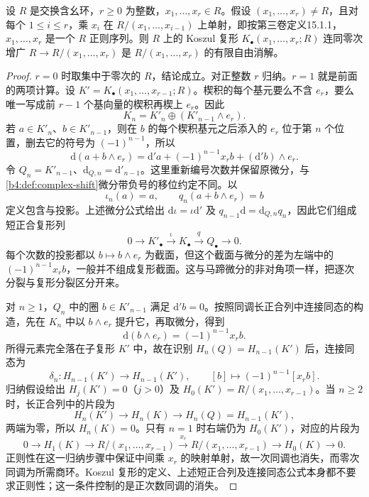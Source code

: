 \begin{proposition}\label{b4:prop:koszul-resolution}
	设 \(R\) 是交换含幺环，\(r\ge0\) 为整数，\(x_1,\ldots,x_r\in R\)。假设 \((x_1,\ldots,x_r)\ne R\)，且对每个 \(1\le i\le r\)，乘 \(x_i\) 在 \(R/(x_1,\ldots,x_{i-1})\) 上单射，即按第三卷定义15.1.1，\(x_1,\ldots,x_r\) 是一个 \(R\) 正则序列。则 \(R\) 上的 Koszul 复形 \(K_\bullet(x_1,\ldots,x_r;R)\) 连同零次增广 \(R\to R/(x_1,\ldots,x_r)\) 是 \(R/(x_1,\ldots,x_r)\) 的有限自由消解。
\end{proposition}
\begin{proof}
	\(r=0\) 时取集中于零次的 \(R\)，结论成立。对正整数 \(r\) 归纳。\(r=1\) 就是前面的两项计算。设 \(K'=K_\bullet(x_1,\ldots,x_{r-1};R)\)。楔积的每个基元要么不含 \(e_r\)，要么唯一写成前 \(r-1\) 个基向量的楔积再楔上 \(e_r\)。因此
	\[
		K_n=K'_n\oplus(K'_{n-1}\wedge e_r).
	\]
	若 \(a\in K'_n\)、\(b\in K'_{n-1}\)，则在 \(b\) 的每个楔积基元之后添入的 \(e_r\) 位于第 \(n\) 个位置，删去它的符号为 \((-1)^{n-1}\)，所以
	\[
		\mathrm{d}(a+b\wedge e_r)=\mathrm{d}'a+(-1)^{n-1}x_rb+(\mathrm{d}'b)\wedge e_r.
	\]
	令 \(Q_n=K'_{n-1}\)、\(\mathrm{d}_{Q,n}=\mathrm{d}'_{n-1}\)。这里重新编号次数并保留原微分，与\cref{b4:def:complex-shift}微分带负号的移位约定不同。以
	\[
		\iota_n(a)=a,\qquad q_n(a+b\wedge e_r)=b
	\]
	定义包含与投影。上述微分公式给出 \(\mathrm{d}\iota=\iota\mathrm{d}'\) 及 \(q_{n-1}\mathrm{d}=\mathrm{d}_{Q,n}q_n\)，因此它们组成短正合复形列
	\[
		0\longrightarrow K'_\bullet\xrightarrow{\iota}K_\bullet \xrightarrow{q}Q_\bullet\longrightarrow0.
	\]
	每个次数的投影都以 \(b\mapsto b\wedge e_r\) 为截面，但这个截面与微分的差为左端中的 \((-1)^{n-1}x_rb\)，一般并不组成复形截面。这与马蹄微分的非对角项一样，把逐次分裂与复形分裂区分开来。

	对 \(n\ge1\)，\(Q_n\) 中的圈 \(b\in K'_{n-1}\) 满足 \(\mathrm{d}'b=0\)。按照同调长正合列中连接同态的构造，先在 \(K_n\) 中以 \(b\wedge e_r\) 提升它，再取微分，得到
	\[
		\mathrm{d}(b\wedge e_r)=(-1)^{n-1}x_rb.
	\]
	所得元素完全落在子复形 \(K'\) 中，故在识别 \(H_n(Q)=H_{n-1}(K')\) 后，连接同态为
	\[
		\delta_n:H_{n-1}(K')\longrightarrow H_{n-1}(K'), \qquad [b]\longmapsto(-1)^{n-1}[x_rb].
	\]
	归纳假设给出 \(H_j(K')=0\)（\(j>0\)）及 \(H_0(K')=R/(x_1,\ldots,x_{r-1})\)。当 \(n\ge2\) 时，长正合列中的片段为
	\[
		H_n(K')\longrightarrow H_n(K)\longrightarrow H_n(Q)=H_{n-1}(K'),
	\]
	两端为零，所以 \(H_n(K)=0\)。只有 \(n=1\) 时右端仍为 \(H_0(K')\)，对应的片段为
	\[
		0\longrightarrow H_1(K)\longrightarrow R/(x_1,\ldots,x_{r-1}) \xrightarrow{x_r}R/(x_1,\ldots,x_{r-1}) \longrightarrow H_0(K)\longrightarrow0.
	\]
	正则性在这一归纳步骤中保证中间乘 \(x_r\) 的映射单射，故一次同调也消失，而零次同调为所需商环。Koszul 复形的定义、上述短正合列及连接同态公式本身都不要求正则性；这一条件控制的是正次数同调的消失。
\end{proof}


